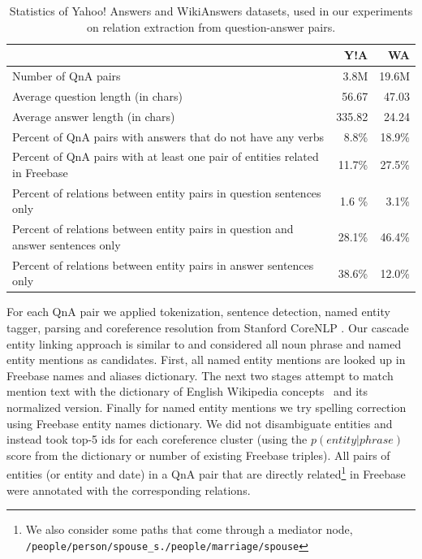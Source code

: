 \begin{table}
\centering
\footnotesize
\begin{tabular}{p{10.5cm}|rr}
& Y!A & WA\\
\hline
Number of QnA pairs & 3.8M & 19.6M \\
Average question length (in chars) & 56.67 & 47.03 \\
Average answer length (in chars) & 335.82 & 24.24 \\
Percent of QnA pairs with answers that do not have any verbs & 8.8\% & 18.9\% \\
Percent of QnA pairs with at least one pair of entities related in Freebase & 11.7\% & 27.5\% \\
Percent of relations between entity pairs in question sentences only & 1.6 \% & 3.1\% \\
Percent of relations between entity pairs in question and answer sentences only & 28.1\% & 46.4\% \\
Percent of relations between entity pairs in answer sentences only & 38.6\%& 12.0\%\\
\end{tabular}
\caption{Statistics of Yahoo! Answers and WikiAnswers datasets, used in our experiments on relation extraction from question-answer pairs.}
\label{table:factoid:cqarelextract:cqastats}
\end{table}

For each QnA pair we applied tokenization, sentence detection, named entity tagger, parsing and coreference resolution from Stanford CoreNLP \cite{manning-EtAl:2014:P14-5}.
Our cascade entity linking approach is similar to \cite{chang2011stanford} and considered all noun phrase and named entity mentions as candidates.
First, all named entity mentions are looked up in Freebase names and aliases dictionary.
The next two stages attempt to match mention text with the dictionary of English Wikipedia concepts~\cite{SPITKOVSKY12.266} and its normalized version.
Finally for named entity mentions we try spelling correction using Freebase entity names dictionary.
We did not disambiguate entities and instead took top-5 ids for each coreference cluster (using the $p(entity|phrase)$ score from the dictionary or number of existing Freebase triples).
All pairs of entities (or entity and date) in a QnA pair that are directly related\footnote{We also consider some paths that come through a mediator node, \eg \texttt{/people/person/spouse\_s./people/marriage/spouse}} in Freebase were annotated with the corresponding relations.

